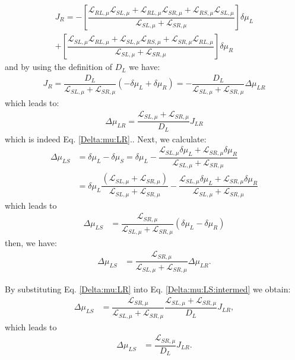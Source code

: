 {\begin{multline*}
J_{R}= 
-\left[
\dfrac{\mathcal{L}_{RL,\mu}\mathcal{L}_{SL,\mu}+\mathcal{L}_{RL,\mu}\mathcal{L}_{SR,\mu}+\mathcal{L}_{RS,\mu}\mathcal{L}_{SL,\mu}}{\mathcal{L}_{SL,\mu}+\mathcal{L}_{SR,\mu}}\right]\delta\mu_{L}
\\+\left[
\dfrac{
\mathcal{L}_{SL,\mu}\mathcal{L}_{RL,\mu}
+\mathcal{L}_{SL,\mu}\mathcal{L}_{RS,\mu}
+\mathcal{L}_{SR,\mu}\mathcal{L}_{RL,\mu}
}{\mathcal{L}_{SL,\mu}+\mathcal{L}_{SR,\mu}}\right]\delta\mu_{R}
\end{multline*}
and by using the definition of $D_{L}$ we have:
\begin{align*}
J_{R}=\dfrac{D_{L}}{\mathcal{L}_{SL,\mu}+\mathcal{L}_{SR,\mu}}(-\delta\mu_{L}+\delta\mu_{R})=-\dfrac{D_{L}}{\mathcal{L}_{SL,\mu}+\mathcal{L}_{SR,\mu}}\Delta\mu_{LR}
\end{align*}
which leads to:
\begin{align*}
\Delta\mu_{LR}=\dfrac{\mathcal{L}_{SL,\mu}+\mathcal{L}_{SR,\mu}}{D_{L}}J_{LR}
\end{align*} which is indeed Eq. \eqref{Delta:mu:LR}.}. Next, we calculate:
\begin{align*}
\Delta\mu_{LS}&=\delta\mu_{L}-\delta\mu_{S}
=
\delta\mu_{L}-\dfrac{\mathcal{L}_{SL,\mu}\delta\mu_{L}+\mathcal{L}_{SR,\mu}\delta\mu_{R}}{\mathcal{L}_{SL,\mu}+\mathcal{L}_{SR,\mu}}
\\
&=\delta\mu_{L}\dfrac{(\mathcal{L}_{SL,\mu}+\mathcal{L}_{SR,\mu})}{\mathcal{L}_{SL,\mu}+\mathcal{L}_{SR,\mu}}-\dfrac{\mathcal{L}_{SL,\mu}\delta\mu_{L}+\mathcal{L}_{SR,\mu}\delta\mu_{R}}{\mathcal{L}_{SL,\mu}+\mathcal{L}_{SR,\mu}}
\end{align*}
which leads to
\begin{align*}
\Delta\mu_{LS}
&=\dfrac{\mathcal{L}_{SR,\mu}}{\mathcal{L}_{SL,\mu}+\mathcal{L}_{SR,\mu}}(\delta\mu_{L}-\delta\mu_{R})
\end{align*}
then, we have:
\begin{align}\label{Delta:mu:LS:intermed}
\Delta\mu_{LS}
&=\dfrac{\mathcal{L}_{SR,\mu}}{\mathcal{L}_{SL,\mu}+\mathcal{L}_{SR,\mu}}\Delta\mu_{LR}.
\end{align}

By substituting Eq. \eqref{Delta:mu:LR} into Eq. \eqref{Delta:mu:LS:intermed} we obtain:
\begin{align}\label{Delta:mu:LS:intermed}
\Delta\mu_{LS}
&=\dfrac{\mathcal{L}_{SR,\mu}}{\mathcal{L}_{SL,\mu}+\mathcal{L}_{SR,\mu}}\dfrac{\mathcal{L}_{SL,\mu}+\mathcal{L}_{SR,\mu}}{D_{L}}J_{LR},
\end{align}
which leads to
\begin{align}\label{Delta:mu:LS}
\Delta\mu_{LS}
&=\dfrac{\mathcal{L}_{SR,\mu}}{D_{L}}J_{LR}.
\end{align}

